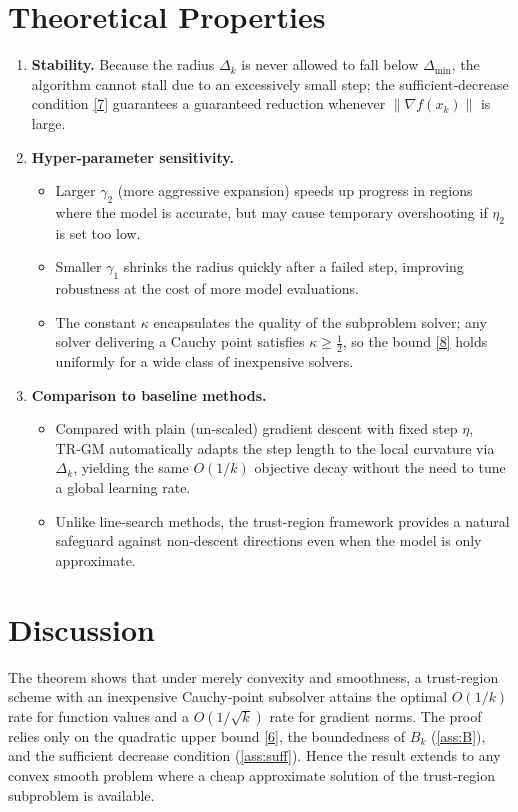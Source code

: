 \documentclass{article}
\begin{document}
\section*{Theoretical Properties}
\begin{enumerate}[label=\arabic*)]
\item \textbf{Stability.}  Because the radius $\Delta_k$ is never allowed to fall below $\Delta_{\min}$, the algorithm cannot stall due to an excessively small step; the sufficient‑decrease condition \eqref{7} guarantees a guaranteed reduction whenever $\|\nabla f(x_k)\|$ is large.

\item \textbf{Hyper‑parameter sensitivity.}
    \begin{itemize}
        \item Larger $\gamma_2$ (more aggressive expansion) speeds up progress in regions where the model is accurate, but may cause temporary overshooting if $\eta_2$ is set too low.
        \item Smaller $\gamma_1$ shrinks the radius quickly after a failed step, improving robustness at the cost of more model evaluations.
        \item The constant $\kappa$ encapsulates the quality of the subproblem solver; any solver delivering a Cauchy point satisfies $\kappa\ge \tfrac12$, so the bound \eqref{8} holds uniformly for a wide class of inexpensive solvers.
    \end{itemize}
\item \textbf{Comparison to baseline methods.}
    \begin{itemize}
        \item Compared with plain (un‑scaled) gradient descent with fixed step $\eta$, TR‑GM automatically adapts the step length to the local curvature via $\Delta_k$, yielding the same $O(1/k)$ objective decay without the need to tune a global learning rate.
        \item Unlike line‑search methods, the trust‑region framework provides a natural safeguard against non‑descent directions even when the model is only approximate.
    \end{itemize}
\end{enumerate}

\section*{Discussion}
The theorem shows that under merely convexity and smoothness, a trust‑region scheme with an inexpensive Cauchy‑point subsolver attains the optimal $O(1/k)$ rate for function values and a $O(1/\sqrt{k})$ rate for gradient norms.  The proof relies only on the quadratic upper bound \eqref{6}, the boundedness of $B_k$ (\ref{ass:B}), and the sufficient decrease condition (\ref{ass:suff}).  Hence the result extends to any convex smooth problem where a cheap approximate solution of the trust‑region subproblem is available.
\end{document}
